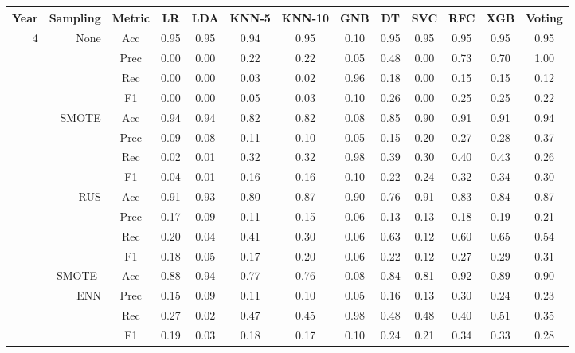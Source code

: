 \begin{table*}
\ContinuedFloat
\begin{narrow}{-1cm}{-1cm}
    \centering
    \begin{tabular}{r|r|c|cccccccccc}
       Year & Sampling & Metric & LR & LDA & KNN-5 & KNN-10 & GNB & DT & SVC & RFC & XGB & Voting \\
        \hline \hline
               
        4 & None & Acc & 0.95 & 0.95 & 0.94 & 0.95 & 0.10 & 0.95 & 0.95 & 0.95 & 0.95 & 0.95 \\
        ~ & ~ & Prec & 0.00 & 0.00 & 0.22 & 0.22 & 0.05 & 0.48 & 0.00 & 0.73 & 0.70 & 1.00 \\
        ~ & ~ & Rec & 0.00 & 0.00 & 0.03 & 0.02 & 0.96 & 0.18 & 0.00 & 0.15 & 0.15 & 0.12 \\
        ~ & ~ & F1 & 0.00 & 0.00 & 0.05 & 0.03 & 0.10 & 0.26 & 0.00 & 0.25 & 0.25 & 0.22 \\
        \cline{2-13}
        ~ & SMOTE & Acc & 0.94 & 0.94 & 0.82 & 0.82 & 0.08 & 0.85 & 0.90 & 0.91 & 0.91 & 0.94 \\
        ~ & ~ & Prec & 0.09 & 0.08 & 0.11 & 0.10 & 0.05 & 0.15 & 0.20 & 0.27 & 0.28 & 0.37 \\
        ~ & ~ & Rec & 0.02 & 0.01 & 0.32 & 0.32 & 0.98 & 0.39 & 0.30 & 0.40 & 0.43 & 0.26 \\
        ~ & ~ & F1 & 0.04 & 0.01 & 0.16 & 0.16 & 0.10 & 0.22 & 0.24 & 0.32 & 0.34 & 0.30 \\
        \cline{2-13}
        ~ & RUS & Acc & 0.91 & 0.93 & 0.80 & 0.87 & 0.90 & 0.76 & 0.91 & 0.83 & 0.84 & 0.87 \\
        ~ & ~ & Prec & 0.17 & 0.09 & 0.11 & 0.15 & 0.06 & 0.13 & 0.13 & 0.18 & 0.19 & 0.21 \\
        ~ & ~ & Rec & 0.20 & 0.04 & 0.41 & 0.30 & 0.06 & 0.63 & 0.12 & 0.60 & 0.65 & 0.54 \\
        ~ & ~ & F1 & 0.18 & 0.05 & 0.17 & 0.20 & 0.06 & 0.22 & 0.12 & 0.27 & 0.29 & 0.31 \\
        \cline{2-13}
        ~ & SMOTE- & Acc & 0.88 & 0.94 & 0.77 & 0.76 & 0.08 & 0.84 & 0.81 & 0.92 & 0.89 & 0.90 \\
        ~ & ENN & Prec & 0.15 & 0.09 & 0.11 & 0.10 & 0.05 & 0.16 & 0.13 & 0.30 & 0.24 & 0.23 \\
        ~ & ~ & Rec & 0.27 & 0.02 & 0.47 & 0.45 & 0.98 & 0.48 & 0.48 & 0.40 & 0.51 & 0.35 \\
        ~ & ~ & F1 & 0.19 & 0.03 & 0.18 & 0.17 & 0.10 & 0.24 & 0.21 & 0.34 & 0.33 & 0.28 \\
        \hline\hline
        

\end{tabular}
\end{narrow}
\end{table*}
